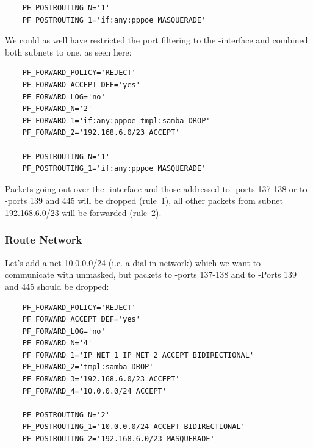 \begin{example}
\begin{verbatim}
    PF_POSTROUTING_N='1'
    PF_POSTROUTING_1='if:any:pppoe MASQUERADE'
\end{verbatim}
\end{example}

We could as well have restricted the port filtering to the
-interface and combined both subnets to one,
as seen here:

\begin{example}
\begin{verbatim}
    PF_FORWARD_POLICY='REJECT'
    PF_FORWARD_ACCEPT_DEF='yes'
    PF_FORWARD_LOG='no'
    PF_FORWARD_N='2'
    PF_FORWARD_1='if:any:pppoe tmpl:samba DROP'
    PF_FORWARD_2='192.168.6.0/23 ACCEPT'

    PF_POSTROUTING_N='1'
    PF_POSTROUTING_1='if:any:pppoe MASQUERADE'
\end{verbatim}
\end{example}

Packets going out over the -interface and those addressed to 
-ports 137-138 or to -ports 139 and 445 will be
dropped (rule~1), all other packets from subnet 192.168.6.0/23 will be 
forwarded (rule~2).

\subsubsection{Route Network}

Let's add a net 10.0.0.0/24 (i.e. a dial-in network) which we want to communicate
with unmasked, but packets to -ports 137-138 and to -Ports
139 and 445 should be dropped:

\begin{example}
\begin{verbatim}
    PF_FORWARD_POLICY='REJECT'
    PF_FORWARD_ACCEPT_DEF='yes'
    PF_FORWARD_LOG='no'
    PF_FORWARD_N='4'
    PF_FORWARD_1='IP_NET_1 IP_NET_2 ACCEPT BIDIRECTIONAL'
    PF_FORWARD_2='tmpl:samba DROP'
    PF_FORWARD_3='192.168.6.0/23 ACCEPT'
    PF_FORWARD_4='10.0.0.0/24 ACCEPT'

    PF_POSTROUTING_N='2'
    PF_POSTROUTING_1='10.0.0.0/24 ACCEPT BIDIRECTIONAL'
    PF_POSTROUTING_2='192.168.6.0/23 MASQUERADE'
\end{verbatim}
\end{example}

